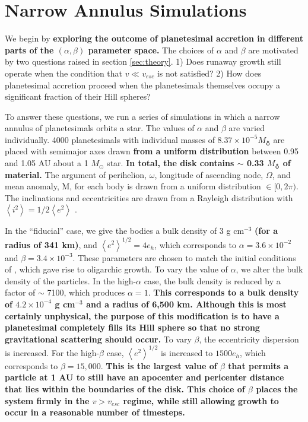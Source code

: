 \documentclass[twocolumn,linenumbers]{aastex63}
\begin{document}
\section{Narrow Annulus Simulations}\label{sec:narrow}

We begin by 
\textbf{exploring the outcome of planetesimal accretion in different parts of the $\left( \alpha, \beta \right)$
parameter space.} The choices of $\alpha$ and $\beta$ are motivated by two questions raised in section \ref{sec:theory}. 1) Does
runaway growth still operate when the condition that $v \ll v_{esc}$
is not satisfied? 2) How does planetesimal accretion proceed when the planetesimals themselves occupy a significant fraction of 
their Hill spheres?

To answer these questions, we run a series of simulations in which a
narrow annulus of planetesimals orbits a star. The values of $\alpha$
and $\beta$ are varied individually. 4000 planetesimals with
individual masses of \textbf{$8.37 \times 10^{-5} M_{\earth}$ } are placed with semimajor
axes drawn \textbf{from a uniform distribution} between 0.95 and 1.05 AU about a 1 $M_{\odot}$
star. \textbf{In total, the disk contains $\sim$ 0.33 $M_{\earth}$ of material.} The argument of perihelion, $\omega$, longitude of ascending node,
$\Omega$, and mean anomaly, M, for each body is drawn from a uniform
distribution $\in [0, 2 \pi)$. The inclinations and eccentricities are drawn
from a Rayleigh distribution with
$\left< i^{2} \right> = 1/2 \left< e^{2} \right>$ \citep{ida93a}.

In the ``fiducial'' case, we give the bodies a bulk density of 3 g
cm$^{-3}$ \textbf{(for a radius of 341 km)}, and $\left< e^{2} \right>^{1/2} = 4 e_{h}$, which corresponds to $\alpha = 3.6 \times 10^{-2}$ and $\beta = 3.4 \times 10^{-3}$. These parameters are chosen to match the initial conditions of \citet{kokubo98}, which gave rise to oligarchic growth. 
To vary the value of $\alpha$, we alter the bulk density of the particles. In the high-$\alpha$ case, the bulk density is reduced by 
a factor of $\sim$ 7100, which produces $\alpha = 1$. \textbf{This corresponds to a bulk density of $4.2 \times 10^{-4}$ g cm$^{-3}$ and a radius of 6,500 km. 
Although this is most certainly unphysical, the purpose of this modification is to have a planetesimal completely fills its Hill sphere so that no strong 
gravitational scattering should occur.} To vary $\beta$, the eccentricity dispersion is increased. For the high-$
\beta$ case, $\left< e^{2} \right>^{1/2}$ is increased to $1500 e_{h}$, which corresponds to $\beta = 15,000$. \textbf{This is the largest value of $\beta$ that permits a particle at 1 AU to still have an apocenter and pericenter distance that lies within the boundaries of the disk. This choice of $\beta$ places the system firmly in the $v > v_{esc}$ regime, while still allowing growth to occur in a reasonable number of timesteps.}
\end{document}
